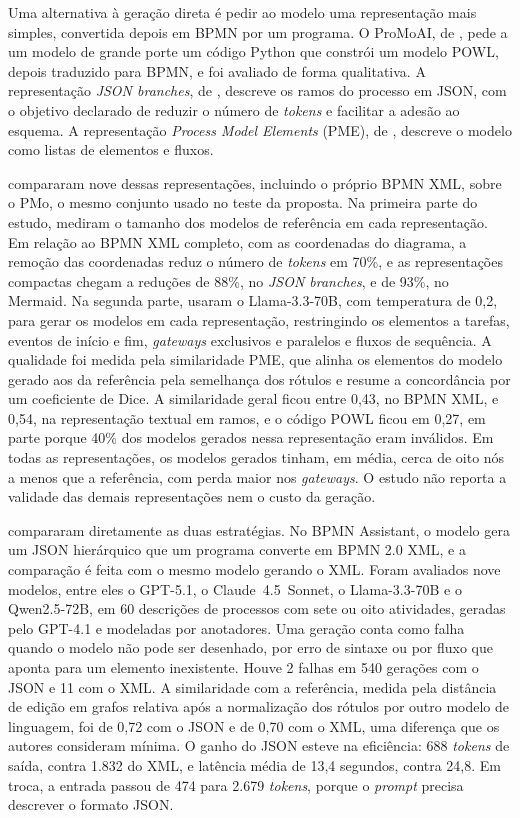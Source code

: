 Uma alternativa à geração direta é pedir ao modelo uma representação mais simples, convertida depois em BPMN por um programa. O ProMoAI, de , pede a um modelo de grande porte um código Python que constrói um modelo POWL, depois traduzido para BPMN, e foi avaliado de forma qualitativa. A representação \textit{JSON branches}, de , descreve os ramos do processo em JSON, com o objetivo declarado de reduzir o número de \textit{tokens} e facilitar a adesão ao esquema. A representação \textit{Process Model Elements} (PME), de , descreve o modelo como listas de elementos e fluxos.

 compararam nove dessas representações, incluindo o próprio BPMN XML, sobre o PMo, o mesmo conjunto usado no teste da proposta. Na primeira parte do estudo, mediram o tamanho dos modelos de referência em cada representação. Em relação ao BPMN XML completo, com as coordenadas do diagrama, a remoção das coordenadas reduz o número de \textit{tokens} em 70\%, e as representações compactas chegam a reduções de 88\%, no \textit{JSON branches}, e de 93\%, no Mermaid. Na segunda parte, usaram o Llama-3.3-70B, com temperatura de 0,2, para gerar os modelos em cada representação, restringindo os elementos a tarefas, eventos de início e fim, \textit{gateways} exclusivos e paralelos e fluxos de sequência. A qualidade foi medida pela similaridade PME, que alinha os elementos do modelo gerado aos da referência pela semelhança dos rótulos e resume a concordância por um coeficiente de Dice. A similaridade geral ficou entre 0,43, no BPMN XML, e 0,54, na representação textual em ramos, e o código POWL ficou em 0,27, em parte porque 40\% dos modelos gerados nessa representação eram inválidos. Em todas as representações, os modelos gerados tinham, em média, cerca de oito nós a menos que a referência, com perda maior nos \textit{gateways}. O estudo não reporta a validade das demais representações nem o custo da geração.

 compararam diretamente as duas estratégias. No BPMN Assistant, o modelo gera um JSON hierárquico que um programa converte em BPMN 2.0 XML, e a comparação é feita com o mesmo modelo gerando o XML. Foram avaliados nove modelos, entre eles o GPT-5.1, o Claude~4.5~Sonnet, o Llama-3.3-70B e o Qwen2.5-72B, em 60 descrições de processos com sete ou oito atividades, geradas pelo GPT-4.1 e modeladas por anotadores. Uma geração conta como falha quando o modelo não pode ser desenhado, por erro de sintaxe ou por fluxo que aponta para um elemento inexistente. Houve 2 falhas em 540 gerações com o JSON e 11 com o XML. A similaridade com a referência, medida pela distância de edição em grafos relativa após a normalização dos rótulos por outro modelo de linguagem, foi de 0,72 com o JSON e de 0,70 com o XML, uma diferença que os autores consideram mínima. O ganho do JSON esteve na eficiência: 688 \textit{tokens} de saída, contra 1.832 do XML, e latência média de 13,4 segundos, contra 24,8. Em troca, a entrada passou de 474 para 2.679 \textit{tokens}, porque o \textit{prompt} precisa descrever o formato JSON.

